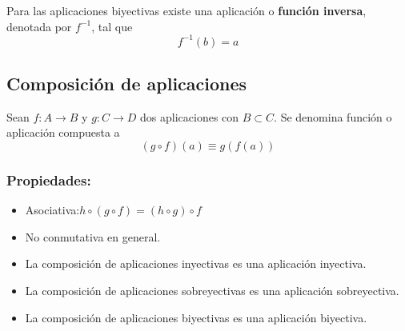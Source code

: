 Para las aplicaciones biyectivas existe una aplicación o \textbf{función inversa}, denotada por $f^{-1}$, tal que
$$
f^{-1}(b)=a
$$

\subsection*{Composición de aplicaciones}
Sean $f:A\rightarrow B$ y $g:C \rightarrow D$ dos aplicaciones con $B \subset C$. Se denomina función o aplicación compuesta a
$$
(g\circ f)(a)\equiv g(f(a))
$$

\subsubsection*{Propiedades:}
\begin{itemize}
\item Asociativa:\quad $ h \circ (g \circ f)=(h \circ g) \circ f$
\item No conmutativa en general.
\item La composición de aplicaciones inyectivas es una aplicación inyectiva.
\item La composición de aplicaciones sobreyectivas es una aplicación sobreyectiva.
\item La composición de aplicaciones biyectivas es una aplicación biyectiva.
\end{itemize}

